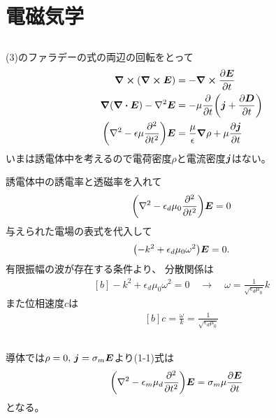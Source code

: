 \documentclass[../../sp_2013.tex]{subfiles}
\begin{document}
\section{電磁気学}
\subsection{}
(3)のファラデーの式の両辺の回転をとって
\begin{equation}\begin{aligned}[b]
    \curl(\curl{\vb*{E}})
        &= -\curl \pdv{\vb*{E}}{t}\\
    \grad(\div{\vb*{E}})-\laplacian{\vb*{E}}
        &= -\mu\pdv{t}\qty(\vb*{j}+\pdv{\vb*{D}}{t})\\
    \qty(\laplacian-\epsilon\mu\pdv[2]{t})\vb*{E}
        &= \frac{\mu}{\epsilon}\grad{\rho}+\mu\pdv{\vb*{j}}{t}
\end{aligned}\end{equation}
いまは誘電体中を考えるので電荷密度\(\rho\)と電流密度\(\vb*{j}\)はない。

誘電体中の誘電率と透磁率を入れて
\begin{equation}\begin{aligned}[b]
    \qty(\laplacian-\epsilon_d\mu_0\pdv[2]{t})\vb*{E} = 0
\end{aligned}\end{equation}
与えられた電場の表式を代入して
\begin{equation}\begin{aligned}[b]
    \qty(-k^2+\epsilon_d\mu_0\omega^2)\vb*{E}=0.
\end{aligned}\end{equation}
有限振幅の波が存在する条件より、
分散関係は
\begin{equation}\begin{aligned}[b]
    -k^2+\epsilon_d\mu_0\omega^2 = 0 \quad \rightarrow \quad
    \omega = \frac{1}{\sqrt{\epsilon_d\mu_0}}k
\end{aligned}\end{equation}
また位相速度\(c\)は
\begin{equation}\begin{aligned}[b]
    c = \frac{\omega}{k} = \frac{1}{\sqrt{\epsilon_d\mu_0}}
\end{aligned}\end{equation}

\subsection{}
導体では\(\rho=0,\,\vb*{j}=\sigma_m \vb*{E}\)より(1-1)式は
\begin{equation}\begin{aligned}[b]
    \qty(\laplacian-\epsilon_m\mu_d\pdv[2]{t})\vb*{E}
        &= \sigma_m\mu\pdv{\vb*{E}}{t}
\end{aligned}\end{equation}
となる。
\end{document}
